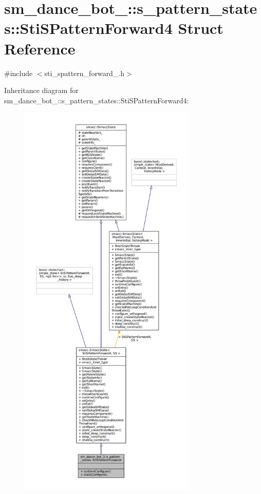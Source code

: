 \hypertarget{structsm__dance__bot__3_1_1s__pattern__states_1_1StiSPatternForward4}{}\section{sm\+\_\+dance\+\_\+bot\+\_\+:\+:s\+\_\+pattern\+\_\+states\+:\+:Sti\+S\+Pattern\+Forward4 Struct Reference}
\label{structsm__dance__bot__3_1_1s__pattern__states_1_1StiSPatternForward4}


{\ttfamily \#include $<$sti\+\_\+spattern\+\_\+forward\+\_.\+h$>$}



Inheritance diagram for sm\+\_\+dance\+\_\+bot\+\_\+:\+:s\+\_\+pattern\+\_\+states\+:\+:Sti\+S\+Pattern\+Forward4\+:
\nopagebreak
\begin{figure}[H]
\begin{center}
\leavevmode
\includegraphics[height=550pt]{structsm__dance__bot__3_1_1s__pattern__states_1_1StiSPatternForward4__inherit__graph}
\end{center}
\end{figure}


